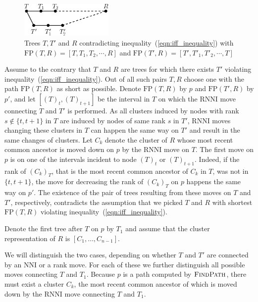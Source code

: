 \documentclass{amsart}
\newcommand{\rnni}{\mathrm{RNNI}}
\newcommand{\findpath}{\textsc{FindPath}}
\newcommand{\nni}{\mathrm{NNI}}
\newcommand{\fp}{\mathrm{FP}}
\begin{document}
\begin{figure}[!hbt]
\centering
\includegraphics[width=0.4\textwidth]{proof_idea}
\vspace{12pt}
\caption{Trees $T, T'$ and $R$ contradicting inequality~(\ref{eqn:iff_inequality}) with $\fp(T,R) = [T,T_1,T_2, \cdots, R]$ and $\fp(T',R) = [T',T'_1,T'_2, \cdots, T]$}
\label{fig:proof_idea}
\end{figure}

Assume to the contrary that $T$ and $R$ are trees for which there exists $T'$ violating inequality~(\ref{eqn:iff_inequality}).
Out of all such pairs $T, R$ choose one with the path $\fp(T, R)$ as short as possible.
Denote $\fp(T,R)$ by $p$ and $\fp(T', R)$ by $p'$, and let $[(T)_t, (T)_{t+1}]$ be the interval in $T$ on which the $\rnni$ move connecting $T$ and $T'$ is performed.
As all clusters induced by nodes with rank $s \notin \{t, t+1\}$ in $T$ are induced by nodes of same rank $s$ in $T'$, $\rnni$ moves changing these clusters in $T$ can happen the same way on $T'$ and result in the same changes of clusters.
Let $C_k$ denote the cluster of $R$ whose most recent common ancestor is moved down on $p$ by the $\rnni$ move on $T$.
The first move on $p$ is on one of the intervals incident to node $(T)_t$ or $(T)_{t+1}$.
Indeed, if the rank of $(C_k)_T$, that is the most recent common ancestor of $C_k$ in $T$, was not in $\{t,t+1\}$, the move for decreasing the rank of $(C_k)_T$ on $p$ happens the same way on $p'$.
The existence of the pair of trees resulting from these moves on $T$ and $T'$, respectively, contradicts the assumption that we picked $T$ and $R$ with shortest $\fp(T,R)$ violating inequality~(\ref{eqn:iff_inequality}).

Denote the first tree after $T$ on $p$ by $T_1$ and assume that the cluster representation of $R$ is
$[C_1, \ldots, C_{n-1}]$.

We will distinguish the two cases, depending on whether $T$ and $T'$ are connected by an $\nni$ or a rank move.
For each of these we further distinguish all possible moves connecting $T$ and $T_1$.
Because $p$ is a path computed by $\findpath$, there must exist a cluster $C_k$, the most recent common ancestor of which is moved down by the $\rnni$ move connecting $T$ and $T_1$.
\end{document}
